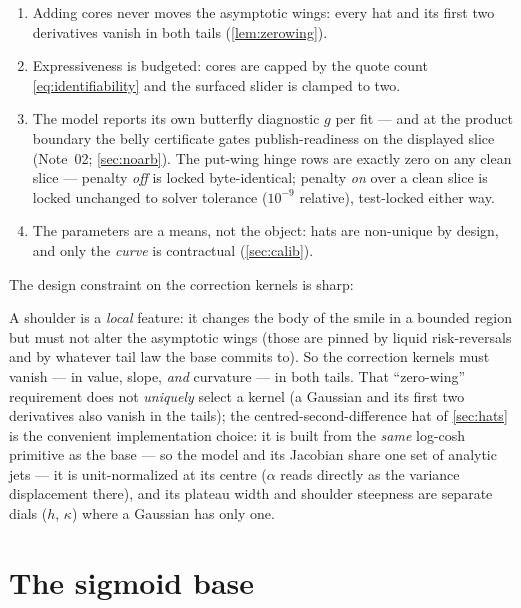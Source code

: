 \documentclass[11pt]{article}
\begin{document}
\begin{invariant}
\begin{enumerate}[leftmargin=1.6em]
\item Adding cores never moves the asymptotic wings: every hat and its first
two derivatives vanish in both tails (\cref{lem:zerowing}).
\item Expressiveness is budgeted: cores are capped by the quote count
\eqref{eq:identifiability} and the surfaced slider is clamped to two.
\item The model reports its own butterfly diagnostic $g$ per fit --- and at
the product boundary the belly certificate gates publish-readiness on the
displayed slice (Note~02; \cref{sec:noarb}). The put-wing hinge rows are
exactly zero on any clean slice --- penalty \emph{off} is locked
byte-identical; penalty \emph{on} over a clean slice is locked unchanged to
solver tolerance ($10^{-9}$ relative), test-locked either way.
\item The parameters are a means, not the object: hats are non-unique by
design, and only the \emph{curve} is contractual
(\cref{sec:calib}).
\end{enumerate}
\end{invariant}

The design constraint on the correction kernels is sharp:

\begin{heuristic}
A shoulder is a \emph{local} feature: it changes the body of the smile in a
bounded region but must not alter the asymptotic wings (those are pinned by
liquid risk-reversals and by whatever tail law the base commits to). So the
correction kernels must vanish --- in value, slope, \emph{and} curvature ---
in both tails. That ``zero-wing'' requirement does not \emph{uniquely} select
a kernel (a Gaussian and its first two derivatives also vanish in the tails);
the centred-second-difference hat of \cref{sec:hats} is the convenient
implementation choice: it is built from the \emph{same} log-cosh primitive as
the base --- so the model and its Jacobian share one set of analytic jets ---
it is unit-normalized at its centre ($\alpha$ reads directly as the variance
displacement there), and its plateau width and shoulder steepness are separate
dials ($h$, $\kappa$) where a Gaussian has only one.
\end{heuristic}

\section{The sigmoid base}
\label{sec:base}
\end{document}
